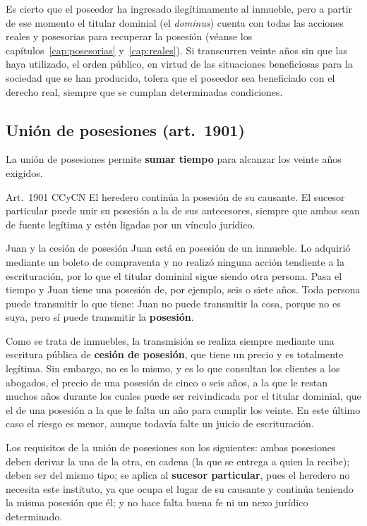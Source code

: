 \documentclass[12pt,oneside]{book}
\begin{document}
Es cierto que el poseedor ha ingresado ilegítimamente al inmueble, pero a partir de ese momento el titular dominial (el \textit{dominus}) cuenta con todas las acciones reales y posesorias para recuperar la posesión (véanse los capítulos~\ref{cap:posesorias} y~\ref{cap:reales}). Si transcurren veinte años sin que las haya utilizado, el orden público, en virtud de las situaciones beneficiosas para la sociedad que se han producido, tolera que el poseedor sea beneficiado con el derecho real, siempre que se cumplan determinadas condiciones.

\subsection{Unión de posesiones (art.~1901)}

La unión de posesiones permite \textbf{sumar tiempo} para alcanzar los veinte años exigidos.

\begin{regla}{Art.~1901 CCyCN}
El heredero continúa la posesión de su causante. El sucesor particular puede unir su posesión a la de sus antecesores, siempre que ambas sean de fuente legítima y estén ligadas por un vínculo jurídico.
\end{regla}

\begin{ejemplo}{Juan y la cesión de posesión}
Juan está en posesión de un inmueble. Lo adquirió mediante un boleto de compraventa y no realizó ninguna acción tendiente a la escrituración, por lo que el titular dominial sigue siendo otra persona. Pasa el tiempo y Juan tiene una posesión de, por ejemplo, seis o siete años. Toda persona puede transmitir lo que tiene: Juan no puede transmitir la cosa, porque no es suya, pero sí puede transmitir la \textbf{posesión}.

Como se trata de inmuebles, la transmisión se realiza siempre mediante una escritura pública de \textbf{cesión de posesión}, que tiene un precio y es totalmente legítima. Sin embargo, no es lo mismo, y es lo que consultan los clientes a los abogados, el precio de una posesión de cinco o seis años, a la que le restan muchos años durante los cuales puede ser reivindicada por el titular dominial, que el de una posesión a la que le falta un año para cumplir los veinte. En este último caso el riesgo es menor, aunque todavía falte un juicio de escrituración.
\end{ejemplo}

Los requisitos de la unión de posesiones son los siguientes: ambas posesiones deben derivar la una de la otra, en cadena (la que se entrega a quien la recibe); deben ser del mismo tipo; se aplica al \textbf{sucesor particular}, pues el heredero no necesita este instituto, ya que ocupa el lugar de su causante y continúa teniendo la misma posesión que él; y no hace falta buena fe ni un nexo jurídico determinado.
\end{document}
